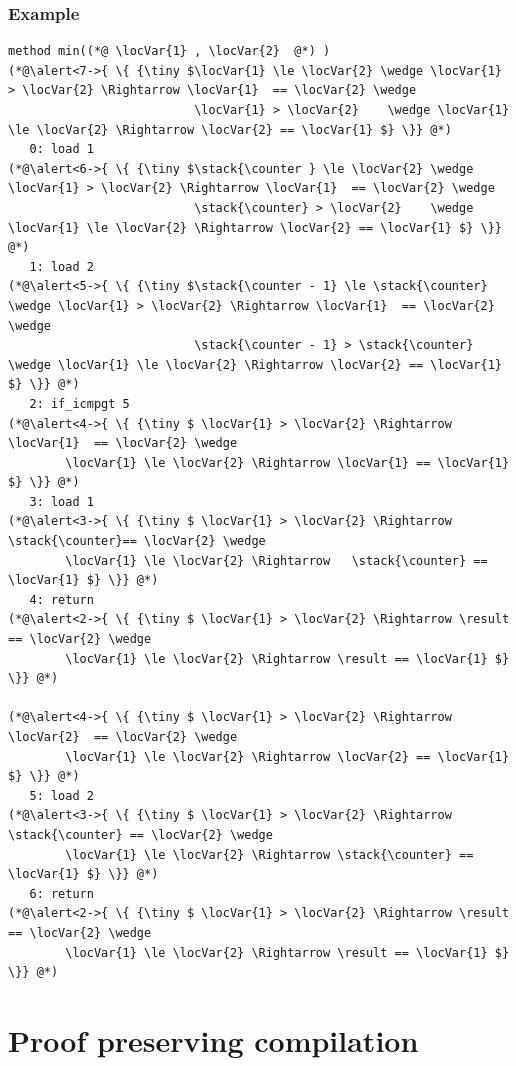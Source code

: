 \documentclass{beamer}
\begin{document}
\begin{frame}\frametitle{Example}
\begin{lstlisting}[language=jvmis]
method min((*@ \locVar{1} , \locVar{2}  @*) )
(*@\alert<7->{ \{ {\tiny $\locVar{1} \le \locVar{2} \wedge \locVar{1} > \locVar{2} \Rightarrow \locVar{1}  == \locVar{2} \wedge 
                          \locVar{1} > \locVar{2}    \wedge \locVar{1} \le \locVar{2} \Rightarrow \locVar{2} == \locVar{1} $} \}} @*)
   0: load 1
(*@\alert<6->{ \{ {\tiny $\stack{\counter } \le \locVar{2} \wedge \locVar{1} > \locVar{2} \Rightarrow \locVar{1}  == \locVar{2} \wedge 
                          \stack{\counter} > \locVar{2}    \wedge \locVar{1} \le \locVar{2} \Rightarrow \locVar{2} == \locVar{1} $} \}} @*)
   1: load 2
(*@\alert<5->{ \{ {\tiny $\stack{\counter - 1} \le \stack{\counter} \wedge \locVar{1} > \locVar{2} \Rightarrow \locVar{1}  == \locVar{2} \wedge 
                          \stack{\counter - 1} > \stack{\counter}    \wedge \locVar{1} \le \locVar{2} \Rightarrow \locVar{2} == \locVar{1} $} \}} @*)
   2: if_icmpgt 5
(*@\alert<4->{ \{ {\tiny $ \locVar{1} > \locVar{2} \Rightarrow \locVar{1}  == \locVar{2} \wedge 
		\locVar{1} \le \locVar{2} \Rightarrow \locVar{1} == \locVar{1} $} \}} @*)
   3: load 1
(*@\alert<3->{ \{ {\tiny $ \locVar{1} > \locVar{2} \Rightarrow \stack{\counter}== \locVar{2} \wedge 
		\locVar{1} \le \locVar{2} \Rightarrow   \stack{\counter} == \locVar{1} $} \}} @*)
   4: return
(*@\alert<2->{ \{ {\tiny $ \locVar{1} > \locVar{2} \Rightarrow \result == \locVar{2} \wedge 
		\locVar{1} \le \locVar{2} \Rightarrow \result == \locVar{1} $} \}} @*)

(*@\alert<4->{ \{ {\tiny $ \locVar{1} > \locVar{2} \Rightarrow \locVar{2}  == \locVar{2} \wedge 
		\locVar{1} \le \locVar{2} \Rightarrow \locVar{2} == \locVar{1} $} \}} @*)
   5: load 2
(*@\alert<3->{ \{ {\tiny $ \locVar{1} > \locVar{2} \Rightarrow \stack{\counter} == \locVar{2} \wedge 
		\locVar{1} \le \locVar{2} \Rightarrow \stack{\counter} == \locVar{1} $} \}} @*)
   6: return
(*@\alert<2->{ \{ {\tiny $ \locVar{1} > \locVar{2} \Rightarrow \result == \locVar{2} \wedge 
		\locVar{1} \le \locVar{2} \Rightarrow \result == \locVar{1} $} \}} @*)
\end{lstlisting}
\end{frame}



\section{Proof preserving compilation}
\end{document}
